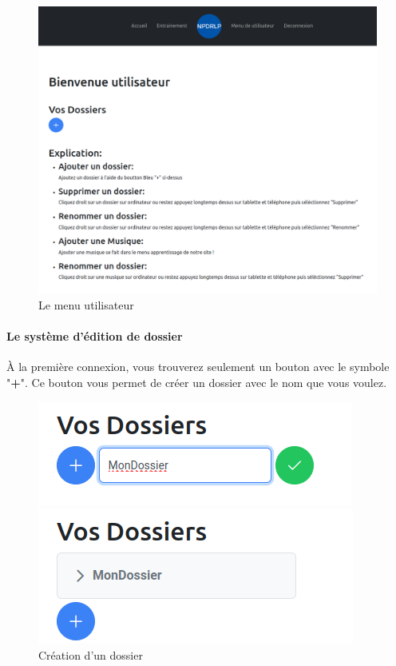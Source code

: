 \documentclass[12pt,french]{article}
\begin{document}
\begin{figure}[H]
	\centering
	\includegraphics[scale=0.25]{menu.png}
	\caption{Le menu utilisateur}
\end{figure}

\paragraph{Le système d'édition de dossier\\}

À la première connexion, vous trouverez seulement un bouton avec le symbole "\textbf{+}". Ce bouton vous permet de créer un dossier avec le nom que vous voulez.

\begin{figure}[H]
	\centering
	\begin{minipage}{.5\textwidth}
		\centering
		\includegraphics[scale=0.4]{dossier1.png}
	\end{minipage}%
	\begin{minipage}{.5\textwidth}
		\centering
		\includegraphics[scale=0.4]{dossier2.png}
	\end{minipage}
	\caption{Création d'un dossier}
\end{figure}
\end{document}
